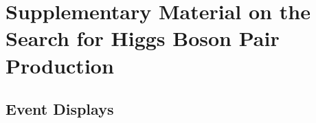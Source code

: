 \chapter{Supplementary Material on the Search for Higgs Boson Pair Production}

\section{Event Displays}


\clearpage













% 

